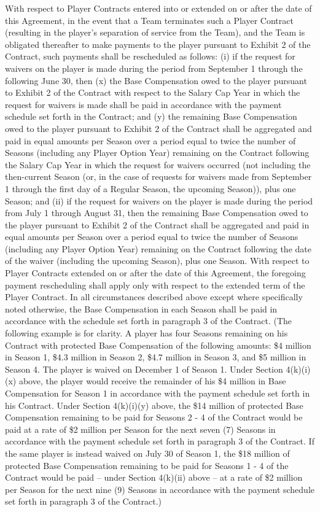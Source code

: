 \documentclass[
]{book}
\begin{document}
\begin{enumerate}
  With respect to Player Contracts entered into or extended on or after the date of this Agreement, in the event that a Team terminates such a Player Contract (resulting in the player's separation of service from the Team), and the Team is obligated thereafter to make payments to the player pursuant to Exhibit 2 of the Contract, such payments shall be rescheduled as follows: (i) if the request for waivers on the player is made during the period from September 1 through the following June 30, then (x) the Base Compensation owed to the player pursuant to Exhibit 2 of the Contract with respect to the Salary Cap Year in which the request for waivers is made shall be paid in accordance with the payment schedule set forth in the Contract; and (y) the remaining Base Compensation owed to the player pursuant to Exhibit 2 of the Contract shall be aggregated and paid in equal amounts per Season over a period equal to twice the number of Seasons (including any Player Option Year) remaining on the Contract following the Salary Cap Year in which the request for waivers occurred (not including the then-current Season (or, in the case of requests for waivers made from September 1 through the first day of a Regular Season, the upcoming Season)), plus one Season; and (ii) if the request for waivers on the player is made during the period from July 1 through August 31, then the remaining Base Compensation owed to the player pursuant to Exhibit 2 of the Contract shall be aggregated and paid in equal amounts per Season over a period equal to twice the number of Seasons (including any Player Option Year) remaining on the Contract following the date of the waiver (including the upcoming Season), plus one Season. With respect to Player Contracts extended on or after the date of this Agreement, the foregoing payment rescheduling shall apply only with respect to the extended term of the Player Contract. In all circumstances described above except where specifically noted otherwise, the Base Compensation in each Season shall be paid in accordance with the schedule set forth in paragraph 3 of the Contract. (The following example is for clarity. A player has four Seasons remaining on his Contract with protected Base Compensation of the following amounts: \$4 million in Season 1, \$4.3 million in Season 2, \$4.7 million in Season 3, and \$5 million in Season 4. The player is waived on December 1 of Season 1. Under Section 4(k)(i)(x) above, the player would receive the remainder of his \$4 million in Base Compensation for Season 1 in accordance with the payment schedule set forth in his Contract. Under Section 4(k)(i)(y) above, the \$14 million of protected Base Compensation remaining to be paid for Seasons 2 - 4 of the Contract would be paid at a rate of \$2 million per Season for the next seven (7) Seasons in accordance with the payment schedule set forth in paragraph 3 of the Contract. If the same player is instead waived on July 30 of Season 1, the \$18 million of protected Base Compensation remaining to be paid for Seasons 1 - 4 of the Contract would be paid -- under Section 4(k)(ii) above -- at a rate of \$2 million per Season for the next nine (9) Seasons in accordance with the payment schedule set forth in paragraph 3 of the Contract.)

\end{enumerate}
\end{document}
